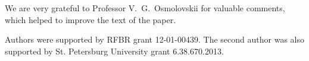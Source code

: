 \vskip 40pt

We are very grateful to Professor V.~G.~Osmolovskii for valuable comments,
which helped to improve the text of the paper.

Authors were supported by RFBR grant 12-01-00439.
The second author was also supported by St. Petersburg University grant 6.38.670.2013.